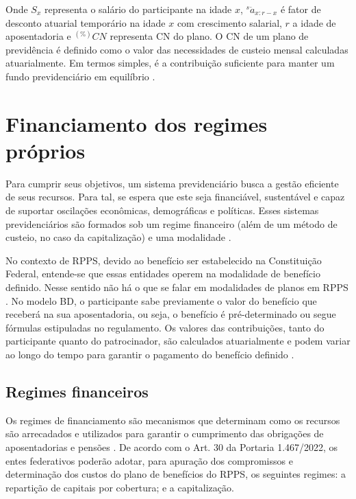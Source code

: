 Onde $S_x$ representa o salário do participante na idade $x$, ${}^{s}\ddot{a}_{x:r-x}$ é fator de desconto atuarial temporário na idade $x$ com crescimento salarial, $r$ a idade de aposentadoria e ${}^{(\%)}CN$ representa CN do plano. O CN de um plano de previdência é definido como o valor das necessidades de custeio mensal calculadas atuarialmente. Em termos simples, é a contribuição suficiente para manter um fundo previdenciário em equilíbrio \cite{correa2020premissas}.

\section{\textbf{Financiamento dos regimes próprios}}

Para cumprir seus objetivos, um sistema previdenciário busca a gestão eficiente de seus recursos. Para tal, se espera que este seja financiável, sustentável e capaz de suportar oscilações econômicas, demográficas e políticas. Esses sistemas previdenciários são formados sob um regime financeiro (além de um método de custeio, no caso da capitalização) e uma modalidade \cite{feldstein2001}.

No contexto de RPPS, devido ao benefício ser estabelecido na Constituição Federal, entende-se que essas entidades operem na modalidade de benefício definido.  Nesse sentido não há o que se falar em modalidades de planos em RPPS \cite{correa2020premissas}. No modelo BD, o participante sabe previamente o valor do benefício que receberá na sua aposentadoria, ou seja, o benefício é pré-determinado ou segue fórmulas estipuladas no regulamento. Os valores das contribuições, tanto do participante quanto do patrocinador, são calculados atuarialmente e podem variar ao longo do tempo para garantir o pagamento do benefício definido \cite{pinheiro2007}.

\subsection{Regimes financeiros}

Os regimes de financiamento são mecanismos que determinam como os recursos são arrecadados e utilizados para garantir o cumprimento das obrigações de aposentadorias e pensões \cite{correa2020premissas, pinheiro2007}. De acordo com o Art. 30 da Portaria 1.467/2022, os entes federativos poderão adotar, para apuração dos compromissos e determinação dos custos do plano de benefícios do RPPS, os seguintes regimes: a repartição de capitais por cobertura; e a capitalização.

